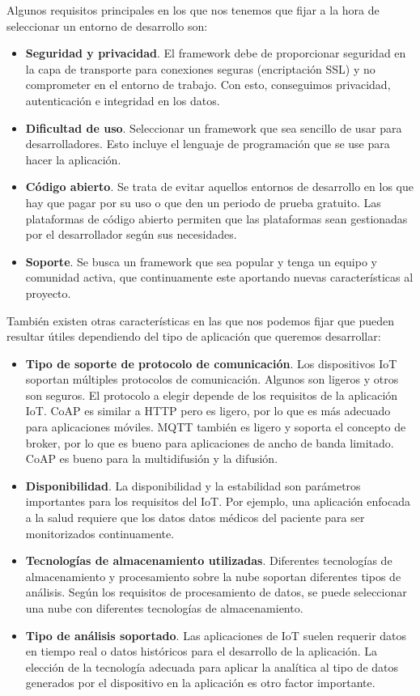 {Algunos requisitos principales en los que nos tenemos que fijar a la hora de seleccionar un entorno de desarrollo son:

\begin{itemize}
    \item \textbf{Seguridad y privacidad}. El framework debe de proporcionar seguridad en la capa de transporte para conexiones seguras (encriptación SSL) y no comprometer en el entorno de trabajo. Con esto, conseguimos privacidad, autenticación e integridad en los datos. 
    \item \textbf{Dificultad de uso}. Seleccionar un framework que sea sencillo de usar para desarrolladores. Esto incluye el lenguaje de programación que se use para hacer la aplicación.
    \item \textbf{Código abierto}. Se trata de evitar aquellos entornos de desarrollo en los que hay que pagar por su uso o que den un periodo de prueba gratuito. Las plataformas de código abierto permiten que las plataformas sean gestionadas por el desarrollador según sus necesidades.
    \item \textbf{Soporte}. Se busca un framework que sea popular y tenga un equipo y comunidad activa, que continuamente este aportando nuevas características al proyecto.
\end{itemize}

También existen otras características en las que nos podemos fijar que pueden resultar útiles dependiendo del tipo de aplicación que queremos desarrollar:

\begin{itemize}
    \item \textbf{Tipo de soporte de protocolo de comunicación}. Los dispositivos IoT soportan múltiples protocolos de comunicación. Algunos son ligeros y otros son seguros. El protocolo a elegir depende de los requisitos de la aplicación IoT. CoAP es similar a HTTP pero es ligero, por lo que es más adecuado para aplicaciones móviles. MQTT también es ligero y soporta el concepto de broker, por lo que es bueno para aplicaciones de ancho de banda limitado. CoAP es bueno para la multidifusión y la difusión.
    \item \textbf{Disponibilidad}. La disponibilidad y la estabilidad son parámetros importantes para los requisitos del IoT. Por ejemplo, una aplicación enfocada a la salud requiere que los datos datos médicos del paciente para ser monitorizados continuamente.
    \item \textbf{Tecnologías de almacenamiento utilizadas}. Diferentes tecnologías de almacenamiento y procesamiento sobre la nube soportan diferentes tipos de análisis. Según los requisitos de procesamiento de datos, se puede seleccionar una nube con diferentes tecnologías de almacenamiento.
    \item \textbf{Tipo de análisis soportado}. Las aplicaciones de IoT suelen requerir datos en tiempo real o datos históricos para el desarrollo de la aplicación. La elección de la tecnología adecuada para aplicar la analítica al tipo de datos generados por el dispositivo en la aplicación es otro factor importante.
\end{itemize}

}
